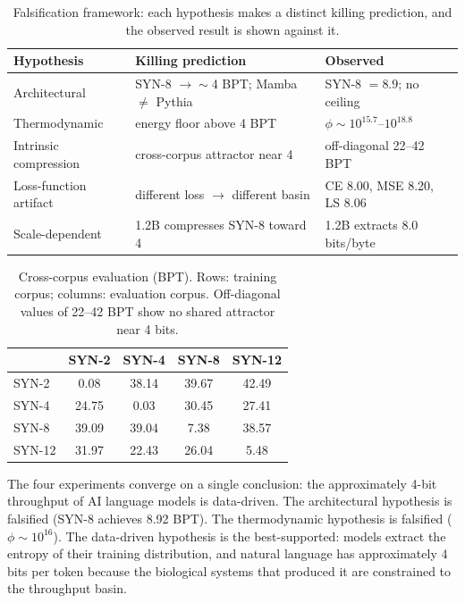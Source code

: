 \documentclass[11pt]{article}
\begin{document}
\begin{table}[ht]
\centering
\caption{Falsification framework: each hypothesis makes a distinct killing prediction, and the observed result is shown against it.}
\label{tab:falsify}
\begin{tabular}{lll}
\toprule
Hypothesis & Killing prediction & Observed \\
\midrule
Architectural & SYN-8 $\to\sim$4 BPT; Mamba $\neq$ Pythia & SYN-8 $= 8.9$; no ceiling \\
Thermodynamic & energy floor above 4 BPT & $\phi\sim10^{15.7}$--$10^{18.8}$ \\
Intrinsic compression & cross-corpus attractor near 4 & off-diagonal 22--42 BPT \\
Loss-function artifact & different loss $\to$ different basin & CE 8.00, MSE 8.20, LS 8.06 \\
Scale-dependent & 1.2B compresses SYN-8 toward 4 & 1.2B extracts 8.0 bits/byte \\
\bottomrule
\end{tabular}
\end{table}

\begin{table}[ht]
\centering
\caption{Cross-corpus evaluation (BPT). Rows: training corpus; columns: evaluation corpus. Off-diagonal values of 22--42 BPT show no shared attractor near 4 bits.}
\label{tab:cross}
\begin{tabular}{lcccc}
\toprule
& SYN-2 & SYN-4 & SYN-8 & SYN-12 \\
\midrule
SYN-2 & 0.08 & 38.14 & 39.67 & 42.49 \\
SYN-4 & 24.75 & 0.03 & 30.45 & 27.41 \\
SYN-8 & 39.09 & 39.04 & 7.38 & 38.57 \\
SYN-12 & 31.97 & 22.43 & 26.04 & 5.48 \\
\bottomrule
\end{tabular}
\end{table}

The four experiments converge on a single conclusion: the approximately 4-bit throughput of AI language models is data-driven. The architectural hypothesis is falsified (SYN-8 achieves 8.92 BPT). The thermodynamic hypothesis is falsified ($\phi \sim 10^{16}$). The data-driven hypothesis is the best-supported: models extract the entropy of their training distribution, and natural language has approximately 4 bits per token because the biological systems that produced it are constrained to the throughput basin.
\end{document}
